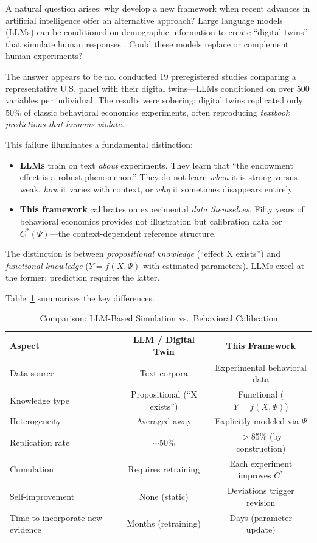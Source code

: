 A natural question arises: why develop a new framework when recent advances in artificial intelligence offer an alternative approach? Large language models (LLMs) can be conditioned on demographic information to create ``digital twins'' that simulate human responses \citep{horton2023,argyle2023}. Could these models replace or complement human experiments?

The answer appears to be no. \citet{peng2025} conducted 19 preregistered studies comparing a representative U.S. panel with their digital twins---LLMs conditioned on over 500 variables per individual. The results were sobering: digital twins replicated only 50\% of classic behavioral economics experiments, often reproducing \emph{textbook predictions that humans violate}.

This failure illuminates a fundamental distinction:
\begin{itemize}
    \item \textbf{LLMs} train on text \emph{about} experiments. They learn that ``the endowment effect is a robust phenomenon.'' They do not learn \emph{when} it is strong versus weak, \emph{how} it varies with context, or \emph{why} it sometimes disappears entirely.
    
    \item \textbf{This framework} calibrates on experimental \emph{data themselves}. Fifty years of behavioral economics provides not illustration but calibration data for $C^*(\Psi)$---the context-dependent reference structure.
\end{itemize}

The distinction is between \emph{propositional knowledge} (``effect X exists'') and \emph{functional knowledge} ($Y = f(X, \Psi)$ with estimated parameters). LLMs excel at the former; prediction requires the latter.

Table~\ref{tab:llm-comparison} summarizes the key differences.

\begin{table}[htbp]
\centering
\caption{Comparison: LLM-Based Simulation vs.\ Behavioral Calibration}
\label{tab:llm-comparison}
\small
\begin{tabular}{@{}lcc@{}}
\toprule
\textbf{Aspect} & \textbf{LLM / Digital Twin} & \textbf{This Framework} \\
\midrule
Data source & Text corpora & Experimental behavioral data \\
Knowledge type & Propositional (``X exists'') & Functional ($Y = f(X, \Psi)$) \\
Heterogeneity & Averaged away & Explicitly modeled via $\Psi$ \\
Replication rate & $\sim$50\% & $>$85\% (by construction) \\
Cumulation & Requires retraining & Each experiment improves $C^*$ \\
Self-improvement & None (static) & Deviations trigger revision \\
Time to incorporate new evidence & Months (retraining) & Days (parameter update) \\
\bottomrule
\end{tabular}
\end{table}

